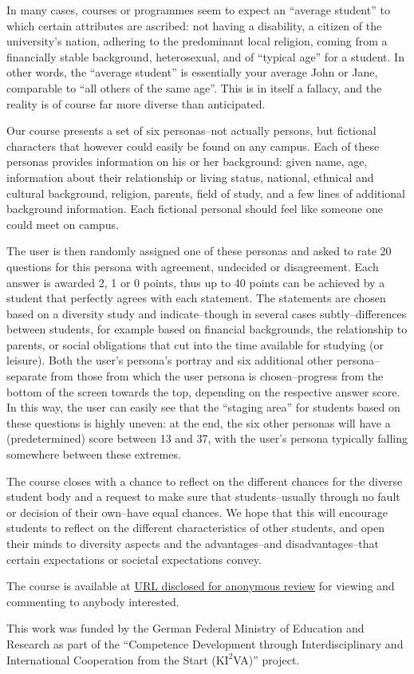 \documentclass[sigconf]{acmart}
\begin{document}
In many cases, courses or programmes seem to expect an ``average student'' to which certain attributes are ascribed: not having 
a disability, a citizen of the university's nation, adhering to the predominant local religion, coming from a financially
stable background, heterosexual, and of ``typical age'' for a student. In other words, the ``average student'' is essentially your
average John or Jane, comparable to ``all others of the same age''. This is in itself a fallacy, and the reality is of course far
more diverse than anticipated.

Our course presents a set of six personas--not actually persons, but fictional characters that however could easily be found on
any campus. Each of these personas provides information on his or her background: given name, age, information about their
relationship or living status, national, ethnical and cultural background, religion, parents, field of study, and a few lines of additional
background information. Each fictional personal should feel like someone one could meet on campus.

The user is then randomly assigned one of these personas and asked to rate 20 questions for this persona with
agreement, undecided or disagreement. Each answer is awarded 2, 1 or 0 points, thus up to 40 points can be achieved by a student
that perfectly agrees with each statement. The statements are chosen based on a diversity study and indicate--though in several
cases subtly--differences between students, for example based on financial backgrounds, the relationship to parents, or social
obligations that cut into the time available for studying (or leisure). Both the user's persona's portray and six additional
other persona--separate from those from which the user persona is chosen--progress from the bottom of the screen towards the top,
depending on the respective answer score. In this way, the user can easily see that the ``staging area'' for students based on these
questions is highly uneven: at the end, the six other personas will have a (predetermined) score between 13 and 37, with the user's
persona typically falling somewhere between these extremes.

The course closes with a chance to reflect on the different chances for the diverse student body and a request to make sure that
students--usually through no fault or decision of their own--have equal chances. We hope that this will encourage students to reflect 
on the different characteristics of other students, and open their minds to diversity aspects and the advantages--and disadvantages--that
certain expectations or societal expectations convey.

The course is available at \url{URL disclosed for anonymous review} for viewing and commenting to anybody interested.


\begin{acks}
This work was funded by the German Federal Ministry of Education and Research as part of the 
``Competence Development through Interdisciplinary and International Cooperation from the Start
(K$\mathrm{I^2}$VA)'' project.
\end{acks}


%
\end{document}
